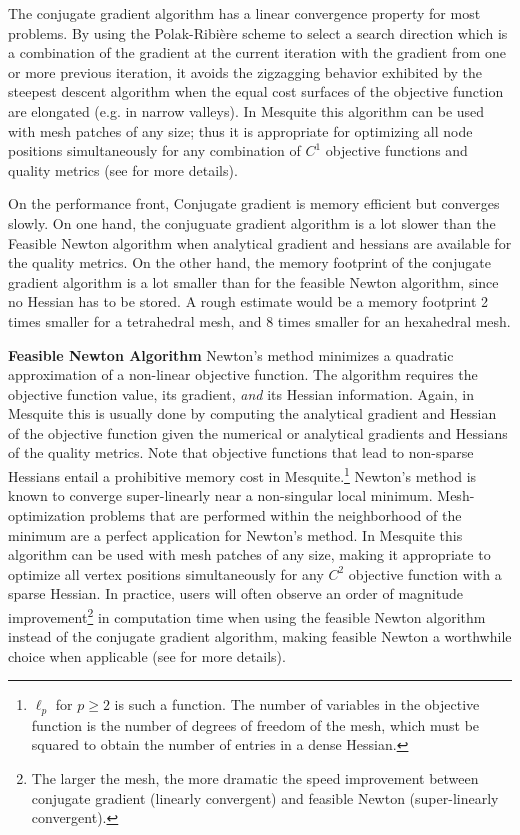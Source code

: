 \documentclass[letter]{report}
\begin{document}
The conjugate gradient algorithm
has a linear convergence property for most problems. By using the
Polak-Ribi\`ere scheme to select a search direction which is a
combination of the gradient at the current iteration with the gradient
from one or more previous iteration, it avoids the zigzagging behavior
exhibited by the steepest descent algorithm when the equal cost
surfaces of the objective function are elongated (e.g. in narrow
valleys). In Mesquite this algorithm can be used with mesh patches of
any size; thus it is appropriate for optimizing all node positions 
simultaneously for any combination of $C^1$ objective functions and
quality metrics (see \cite{FeasNewt} for more details). 

On the performance front, Conjugate gradient is memory efficient but converges slowly.
On one hand, the conjuguate gradient algorithm is a lot slower than the Feasible Newton algorithm
when analytical gradient and hessians are available for the quality metrics. On the other hand, the
memory footprint of the conjugate gradient algorithm is a lot smaller than for the feasible Newton 
algorithm, since no Hessian has to be stored. A rough estimate would be a memory 
footprint 2 times smaller for a tetrahedral mesh, and 8 times smaller for an hexahedral mesh.  
\newline

{\bf Feasible Newton Algorithm } \newline
\label{append_feasnewt}
Newton's method minimizes a quadratic
approximation of a non-linear objective function. The algorithm requires
the objective function value, its gradient, \emph{and} its Hessian information.
Again, in Mesquite this
is usually done by computing the analytical gradient and Hessian of
the objective function given the numerical or analytical gradients and
Hessians of the quality metrics.  Note that objective functions that
lead to non-sparse Hessians entail a prohibitive memory cost in
Mesquite.\footnote{$\ell_p$ for $p \geq 2$ is such a function. The
number of variables in the objective function is the number of degrees
of freedom of the mesh, which must be squared to obtain the number of
entries in a dense Hessian.}  Newton's method is known to converge
super-linearly near a non-singular local minimum.   
Mesh-optimization problems that are performed within the neighborhood of
the minimum are a perfect application for Newton's method. In
Mesquite this algorithm can be used with mesh patches of any size,
making it appropriate to optimize all vertex positions simultaneously
for any $C^2$ objective function with a sparse Hessian.  In practice,
users will often observe an order of magnitude improvement\footnote{The larger the mesh, the
more dramatic the speed improvement between conjugate gradient (linearly convergent) and feasible
Newton (super-linearly convergent).} in
computation time when using the feasible Newton algorithm instead of
the conjugate gradient algorithm, making feasible Newton a worthwhile
choice when applicable (see \cite{FeasNewt} for more details). \newline
\end{document}
